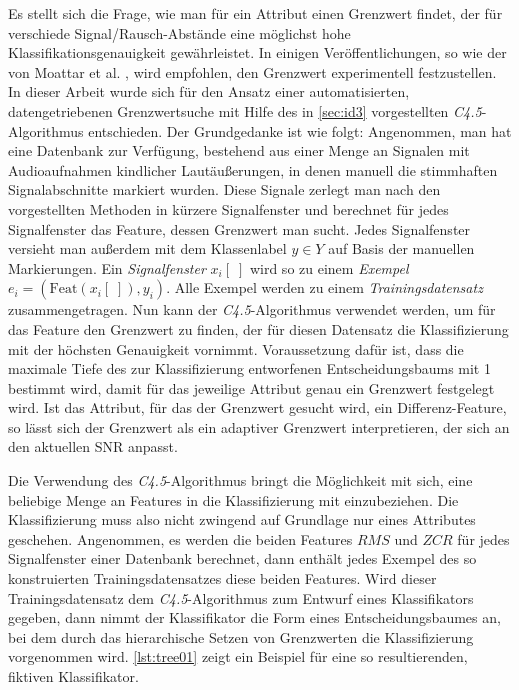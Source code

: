 Es stellt sich die Frage, wie man für ein Attribut einen Grenzwert findet, der für verschiede Signal/Rausch-Abstände eine möglichst hohe Klassifikationsgenauigkeit gewährleistet. In einigen Veröffentlichungen, so wie der von Moattar et al. \cite{vad_Easy}, wird empfohlen, den Grenzwert experimentell festzustellen. In dieser Arbeit wurde sich für den Ansatz einer automatisierten, datengetriebenen Grenzwertsuche mit Hilfe des in \autoref{sec:id3} vorgestellten \emph{C4.5}-Algorithmus entschieden. Der Grundgedanke ist wie folgt: Angenommen, man hat eine Datenbank zur Verfügung, bestehend aus einer Menge an Signalen mit Audioaufnahmen kindlicher Lautäußerungen, in denen manuell die stimmhaften Signalabschnitte markiert wurden. Diese Signale zerlegt man nach den vorgestellten Methoden in kürzere Signalfenster und berechnet für jedes Signalfenster das Feature, dessen Grenzwert man sucht. Jedes Signalfenster versieht man außerdem mit dem Klassenlabel $y \in Y$ auf Basis der manuellen Markierungen. Ein \emph{Signalfenster} $x_i[\;]$ wird so zu einem \emph{Exempel} $e_i = (\text{Feat}(x_i[\;]), y_i)$. Alle Exempel werden zu einem \emph{Trainingsdatensatz} zusammengetragen. Nun kann der \emph{C4.5}-Algorithmus verwendet werden, um für das Feature den Grenzwert zu finden, der für diesen Datensatz die Klassifizierung mit der höchsten Genauigkeit vornimmt. Voraussetzung dafür ist, dass die maximale Tiefe des zur Klassifizierung entworfenen Entscheidungsbaums mit 1 bestimmt wird, damit für das jeweilige Attribut genau ein Grenzwert festgelegt wird. Ist das Attribut, für das der Grenzwert gesucht wird, ein Differenz-Feature, so lässt sich der Grenzwert als ein adaptiver Grenzwert interpretieren, der sich an den aktuellen SNR anpasst.

Die Verwendung des \emph{C4.5}-Algorithmus bringt die Möglichkeit mit sich, eine beliebige Menge an Features in die Klassifizierung mit einzubeziehen. Die Klassifizierung muss also nicht zwingend auf Grundlage nur eines Attributes geschehen. Angenommen, es werden die beiden Features $RMS$ und $ZCR$ für jedes Signalfenster einer Datenbank berechnet, dann enthält jedes Exempel des so konstruierten Trainingsdatensatzes diese beiden Features. Wird dieser Trainingsdatensatz dem \emph{C4.5}-Algorithmus zum Entwurf eines Klassifikators gegeben, dann nimmt der Klassifikator die Form eines Entscheidungsbaumes an, bei dem durch das hierarchische Setzen von Grenzwerten die Klassifizierung vorgenommen wird. \autoref{lst:tree01} zeigt ein Beispiel für eine so resultierenden, fiktiven Klassifikator.

